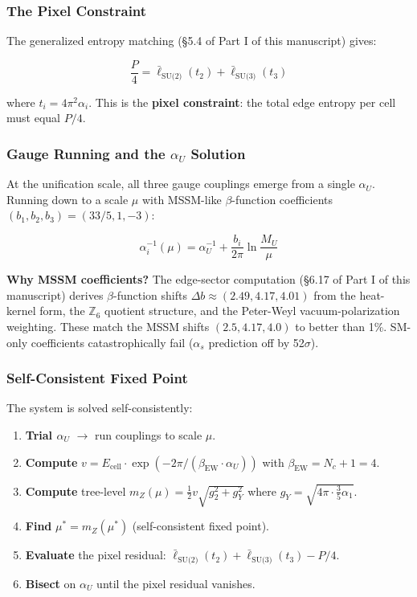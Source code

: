 \subsubsection{The Pixel Constraint}\label{32-the-pixel-constraint}

The generalized entropy matching (\S{}5.4 of Part I of this manuscript) gives:

\[\frac{P}{4} = \bar{\ell}_{\text{SU(2)}}(t_2) + \bar{\ell}_{\text{SU(3)}}(t_3)\]

where \(t_i = 4\pi^2 \alpha_i\). This is the \textbf{pixel constraint}: the total edge entropy per cell must equal \(P/4\).

\subsubsection{\texorpdfstring{Gauge Running and the \(\alpha_U\) Solution}{Gauge Running and the \textbackslash alpha\_U Solution}}\label{33-gauge-running-and-the-alpha_u-solution}

At the unification scale, all three gauge couplings emerge from a single \(\alpha_U\). Running down to a scale \(\mu\) with MSSM-like \(\beta\)-function coefficients \((b_1, b_2, b_3) = (33/5, 1, -3)\):

\[\alpha_i^{-1}(\mu) = \alpha_U^{-1} + \frac{b_i}{2\pi} \ln\frac{M_U}{\mu}\]

\textbf{Why MSSM coefficients?} The edge-sector computation (\S{}6.17 of Part I of this manuscript) derives \(\beta\)-function shifts \(\Delta b \approx (2.49, 4.17, 4.01)\) from the heat-kernel form, the \(\mathbb{Z}_6\) quotient structure, and the Peter-Weyl vacuum-polarization weighting. These match the MSSM shifts \((2.5, 4.17, 4.0)\) to better than 1\%. SM-only coefficients catastrophically fail (\(\alpha_s\) prediction off by 52\(\sigma\)).

\subsubsection{Self-Consistent Fixed Point}\label{34-self-consistent-fixed-point}

The system is solved self-consistently:

\begin{enumerate}
\def\labelenumi{\arabic{enumi}.}
\tightlist
\item
  \textbf{Trial \(\alpha_U\)} \(\rightarrow\) run couplings to scale \(\mu\).
\item
  \textbf{Compute} \(v = E_{\text{cell}} \cdot \exp(-2\pi/(\beta_{\text{EW}} \cdot \alpha_U))\) with \(\beta_{\text{EW}} = N_c + 1 = 4\).
\item
  \textbf{Compute} tree-level \(m_Z(\mu) = \frac{1}{2} v \sqrt{g_2^2 + g_Y^2}\) where \(g_Y = \sqrt{4\pi \cdot \frac{3}{5}\alpha_1}\).
\item
  \textbf{Find} \(\mu^* = m_Z(\mu^*)\) (self-consistent fixed point).
\item
  \textbf{Evaluate} the pixel residual: \(\bar{\ell}_{\text{SU(2)}}(t_2) + \bar{\ell}_{\text{SU(3)}}(t_3) - P/4\).
\item
  \textbf{Bisect} on \(\alpha_U\) until the pixel residual vanishes.
\end{enumerate}

